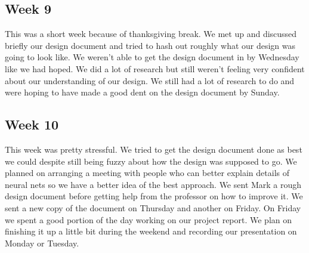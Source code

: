 \documentclass[onecolumn, draftclsnofoot,10pt, compsoc]{IEEEtran}
\begin{document}
\subsection{Week 9}
This was a short week because of thanksgiving break.
We met up and discussed briefly our design document and tried to hash out roughly what our design was going to look like.
We weren't able to get the design document in by Wednesday like we had hoped.
We did a lot of research but still weren't feeling very confident about our understanding of our design.
We still had a lot of research to do and were hoping to have made a good dent on the design document by Sunday.

\subsection{Week 10}
This week was pretty stressful.
We tried to get the design document done as best we could despite still being fuzzy about how the design was supposed to go.
We planned on arranging a meeting with people who can better explain details of neural nets so we have a better idea of the best approach.
We sent Mark a rough design document before getting help from the professor on how to improve it.
We sent a new copy of the document on Thursday and another on Friday.
On Friday we spent a good portion of the day working on our project report.
We plan on finishing it up a little bit during the weekend and recording our presentation on Monday or Tuesday.
\end{document}
